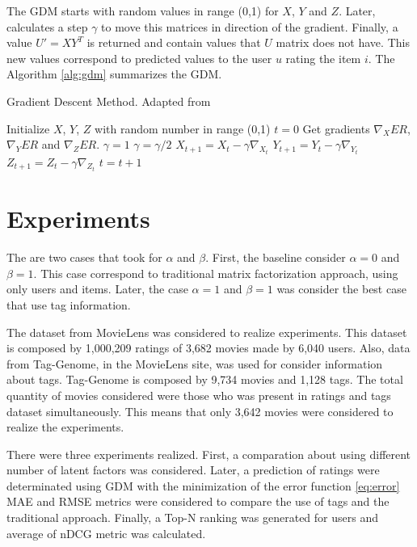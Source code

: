 \documentclass{sig-alternate}
\begin{document}
The GDM starts with random values in range (0,1) for $X$, $Y$ and $Z$. Later, calculates a step $\gamma$ to move this matrices in direction of the gradient. Finally, a value $U'=XY^T$ is returned and contain values that $U$ matrix does not have. This new values correspond to predicted values to the user $u$ rating the item $i$. The Algorithm \ref{alg:gdm} summarizes the GDM.

\begin{algorithm}
\caption{Gradient Descent Method. Adapted from \cite{tag}}
\label{alg:gdm}
\begin{algorithmic}[1]
\STATE Initialize $X$, $Y$, $Z$ with random number in range (0,1)
\STATE $t = 0$
\STATE Get gradients $\nabla_XER$, $\nabla_YER$ and $\nabla_ZER$.
\STATE $\gamma=1$
\STATE $\gamma = \gamma/2$
\ENDWHILE
\STATE $X_{t+1} = X_{t}-\gamma\nabla_{X_t}$
\STATE $Y_{t+1} = Y_{t}-\gamma\nabla_{Y_t}$
\STATE $Z_{t+1} = Z_{t}-\gamma\nabla_{Z_t}$
\STATE $t = t+1$
\ENDWHILE
\end{algorithmic}
\end{algorithm}

\section{Experiments}

The are two cases that \cite{tag} took for $\alpha$ and $\beta$. First, the baseline consider $\alpha=0$ and $\beta=1$. This case correspond to traditional matrix factorization approach, using only users and items. Later, the case $\alpha=1$ and $\beta=1$ was consider the best case that use tag information.

The dataset from MovieLens was considered to realize experiments. This dataset is composed by 1,000,209 ratings of 3,682 movies made by 6,040 users. Also, data from Tag-Genome, in the MovieLens site, was used for consider information about tags. Tag-Genome is composed by 9,734 movies and 1,128 tags. The total quantity of movies considered were those who was present in ratings and tags dataset simultaneously. This means that only 3,642 movies were considered to realize the experiments.

There were three experiments realized. First, a comparation about using different number of latent factors was considered. Later, a prediction of ratings were determinated using GDM with the minimization of the error function \eqref{eq:error} MAE and RMSE metrics were considered to compare the use of tags and the traditional approach. Finally, a Top-N ranking was generated for users and average of nDCG metric was calculated.
\end{document}
